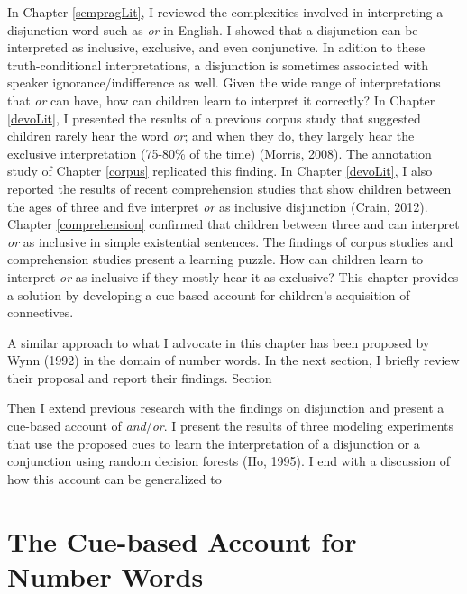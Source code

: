 \documentclass[oneside]{report}
\theoremstyle{definition}
\theoremstyle{definition}
\theoremstyle{definition}
\theoremstyle{remark}
\begin{document}
In Chapter \ref{sempragLit}, I reviewed the complexities involved in
interpreting a disjunction word such as \emph{or} in English. I showed
that a disjunction can be interpreted as inclusive, exclusive, and even
conjunctive. In adition to these truth-conditional interpretations, a
disjunction is sometimes associated with speaker ignorance/indifference
as well. Given the wide range of interpretations that \emph{or} can
have, how can children learn to interpret it correctly? In Chapter
\ref{devoLit}, I presented the results of a previous corpus study that
suggested children rarely hear the word \emph{or}; and when they do,
they largely hear the exclusive interpretation (75-80\% of the time)
(Morris, 2008). The annotation study of Chapter \ref{corpus} replicated
this finding. In Chapter \ref{devoLit}, I also reported the results of
recent comprehension studies that show children between the ages of
three and five interpret \emph{or} as inclusive disjunction (Crain,
2012). Chapter \ref{comprehension} confirmed that children between three
and can interpret \emph{or} as inclusive in simple existential
sentences. The findings of corpus studies and comprehension studies
present a learning puzzle. How can children learn to interpret \emph{or}
as inclusive if they mostly hear it as exclusive? This chapter provides
a solution by developing a cue-based account for children's acquisition
of connectives.

A similar approach to what I advocate in this chapter has been proposed
by Wynn (1992) in the domain of number words. In the next section, I
briefly review their proposal and report their findings. Section

Then I extend previous research with the findings on disjunction and
present a cue-based account of \emph{and}/\emph{or}. I present the
results of three modeling experiments that use the proposed cues to
learn the interpretation of a disjunction or a conjunction using random
decision forests (Ho, 1995). I end with a discussion of how this account
can be generalized to

\section{The Cue-based Account for Number
Words}\label{the-cue-based-account-for-number-words}
\end{document}
